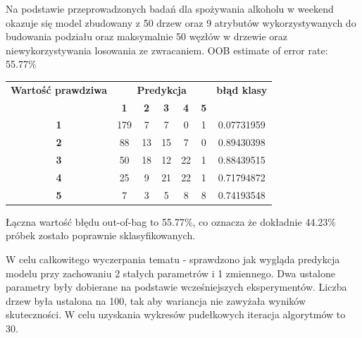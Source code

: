 
Na podstawie przeprowadzonych badań dla spożywania alkoholu w weekend okazuje się model zbudowany z 50 drzew oraz 9 atrybutów wykorzystywanych do  budowania podziału oraz maksymalnie 50 węzłów w drzewie oraz niewykorzystywania losowania ze zwracaniem.
 OOB estimate of  error rate: 55.77\%
 
 \begin{table}[h!]
\begin{tabular}{|c|c|c|c|c|c|c|}
\hline
\multirow{}{}{\textbf{Wartość  prawdziwa}} & \multicolumn{5}{c|}{\textbf{ Predykcja}}                                & \multirow{}{}{\textbf{błąd klasy}} \\ \cline{2-6}
                            & \textbf{1} & \textbf{2} & \textbf{3} & \textbf{4} & \textbf{5} &                                      \\ \hline
\textbf{1}                  & 179        & 7          & 7          & 0          & 1          & 0.07731959                           \\ \hline
\textbf{2}                  & 88         & 13         & 15         & 7          & 0          & 0.89430398                          \\ \hline
\textbf{3}                  & 50         & 18         & 12         & 22         & 1          & 0.88439515                           \\ \hline
\textbf{4}                  & 25         & 9          & 21         & 22         & 1          & 0.71794872                           \\ \hline
\textbf{5}                  & 7          & 3          & 5          & 8          & 8          & 0.74193548                           \\ \hline
\end{tabular}
\end{table}
Łączna wartość błędu out-of-bag to 55.77\%, co oznacza że dokładnie 44.23\% próbek zostało poprawnie sklasyfikowanych. 

W celu całkowitego wyczerpania tematu - sprawdzono jak wygląda predykcja modelu przy zachowaniu 2 stałych parametrów i 1 zmiennego. Dwa ustalone parametry były dobierane na podstawie wcześniejszych eksperymentów. Liczba drzew była ustalona na 100, tak aby wariancja nie zawyżała wyników skuteczności. W celu uzyskania wykresów pudełkowych iteracja algorytmów to 30. 

